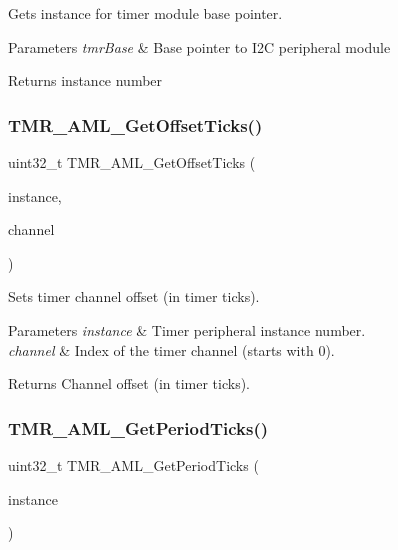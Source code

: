 Gets instance for timer module base pointer. 


\begin{DoxyParams}{Parameters}
{\em tmr\+Base} & Base pointer to I2C peripheral module \\
\hline
\end{DoxyParams}
\begin{DoxyReturn}{Returns}
instance number 
\end{DoxyReturn}
\mbox{\label{group__function__group_ga98c1f0d4ed77a3cbf909fafef40f89d3}} 
\subsubsection{\texorpdfstring{TMR\_AML\_GetOffsetTicks()}{TMR\_AML\_GetOffsetTicks()}}
{\footnotesize\ttfamily uint32\+\_\+t T\+M\+R\+\_\+\+A\+M\+L\+\_\+\+Get\+Offset\+Ticks (\begin{DoxyParamCaption}\item[{\mbox{\hyperlink{common__aml_8h_a562bd37c7d07adcedec5993bc0cd96e5}{aml\+\_\+instance\+\_\+t}}}]{instance,  }\item[{uint8\+\_\+t}]{channel }\end{DoxyParamCaption})}



Sets timer channel offset (in timer ticks). 


\begin{DoxyParams}{Parameters}
{\em instance} & Timer peripheral instance number. \\
\hline
{\em channel} & Index of the timer channel (starts with 0).\\
\hline
\end{DoxyParams}
\begin{DoxyReturn}{Returns}
Channel offset (in timer ticks). 
\end{DoxyReturn}
\mbox{\label{group__function__group_ga785236cb13d536bfe7b59bd484de01aa}} 
\subsubsection{\texorpdfstring{TMR\_AML\_GetPeriodTicks()}{TMR\_AML\_GetPeriodTicks()}}
{\footnotesize\ttfamily uint32\+\_\+t T\+M\+R\+\_\+\+A\+M\+L\+\_\+\+Get\+Period\+Ticks (\begin{DoxyParamCaption}\item[{\mbox{\hyperlink{common__aml_8h_a562bd37c7d07adcedec5993bc0cd96e5}{aml\+\_\+instance\+\_\+t}}}]{instance }\end{DoxyParamCaption})}



